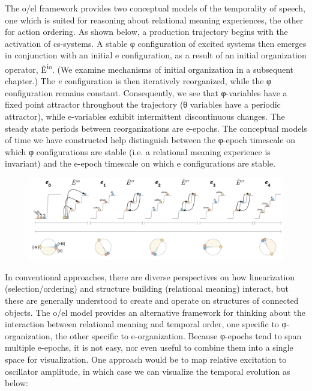The o/el framework provides two conceptual models of the temporality of speech, one which is suited for reasoning about relational meaning experiences, the other for action ordering. As shown below, a production trajectory begins with the activation of cs-systems. A stable φ configuration of excited systems then emerges in conjunction with an initial e configuration, as a result of an initial organization operator, Ê\textsuperscript{io}. (We examine mechanisms of initial organization in a subsequent chapter.) The \textit{e} configuration is then iteratively reorganized, while the φ configuration remains constant. Consequently, we see that φ-variables have a fixed point attractor throughout the trajectory (θ variables have a periodic attractor), while e-variables exhibit intermittent discontinuous changes. The steady state periods between reorganizations are e-epochs. The conceptual models of time we have constructed help distinguish between the φ-epoch timescale on which φ configurations are stable (i.e. a relational meaning experience is invariant) and the e-epoch timescale on which e configurations are stable.

  
\begin{figure}
\includegraphics[width=\textwidth]{figures/Tilsen-img27.png}
\caption{\missingcaption}
\label{fig:2:20}
\end{figure}
 

  In conventional approaches, there are diverse perspectives on how linearization (selection/ordering) and structure building (relational meaning) interact, but these are generally understood to create and operate on structures of connected objects. The o/el model provides an alternative framework for thinking about the interaction between relational meaning and temporal order, one specific to φ-organization, the other specific to e-organization. Because φ-epochs tend to span multiple e-epochs, it is not easy, nor even useful to combine them into a single space for visualization. One approach would be to map relative excitation to oscillator amplitude, in which case we can visualize the temporal evolution as below:

